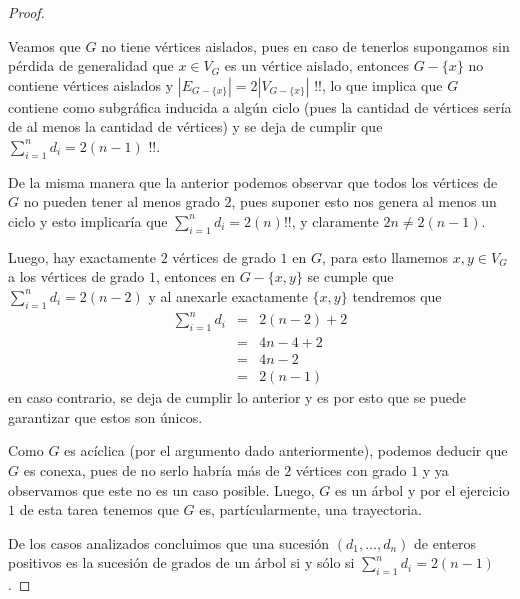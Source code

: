 \documentclass{article}
\begin{document}
\begin{enumerate}
\begin{proof}
\begin{itemize}
        Veamos que $G$ no tiene v\'ertices aislados, pues en caso de tenerlos
        supongamos sin p\'erdida de generalidad que $x \in V_G$ es un
        v\'ertice aislado, entonces $G - \{x\}$ no contiene v\'ertices aislados
        y $|E_{G - \{x\}}| = 2|V_{G - \{x\}}|$ !!, lo que implica que $G$ contiene como
        subgr\'afica inducida a alg\'un ciclo (pues la cantidad de v\'ertices
        ser\'ia de al menos la cantidad de v\'ertices) y se deja de cumplir que
        $\sum_{i=1}^n d_i = 2(n-1)$ !!.
        
        De la misma manera que la anterior podemos observar que todos los v\'ertices
        de $G$ no pueden tener al menos grado $2$, pues suponer esto nos genera
        al menos un ciclo y esto implicar\'ia que $\sum_{i=1}^n d_i = 2(n)$!!, y
        claramente $2n \not= 2(n - 1)$.
        
        Luego, hay exactamente $2$ v\'ertices de grado $1$ en $G$, para esto
        llamemos $x, y \in V_G$ a los v\'ertices de grado $1$, entonces en
        $G -\{x, y\}$ se cumple que $\sum_{i=1}^n d_i = 2(n-2)$ y al anexarle
        exactamente $\{x, y\}$ tendremos que
        \begin{eqnarray*}
          \sum_{i=1}^n d_i &=& 2(n-2) + 2\\
          &=& 4n - 4 + 2\\
          &=& 4n - 2\\
          &=& 2(n - 1)
        \end{eqnarray*}
        en caso contrario, se deja de cumplir lo anterior y es por esto que
        se puede garantizar que estos son \'unicos.
        
        Como $G$ es ac\'iclica (por el argumento dado anteriormente), podemos
        deducir que $G$ es conexa, pues de no serlo habr\'ia m\'as de $2$
        v\'ertices con grado $1$ y ya observamos que este no es un caso posible.
        Luego, $G$ es un \'arbol y por el ejercicio $1$ de esta tarea tenemos
        que $G$ es, part\'icularmente, una trayectoria.
      \end{itemize}
      
      De los casos analizados concluimos que una sucesi\'on $(d_1, \dots,
      d_n)$ de enteros positivos es la sucesi\'on de grados de un \'arbol
      si y s\'olo si $\displaystyle \sum_{i=1}^n d_i = 2(n-1)$.
    \end{proof}
\end{enumerate}
\end{document}
